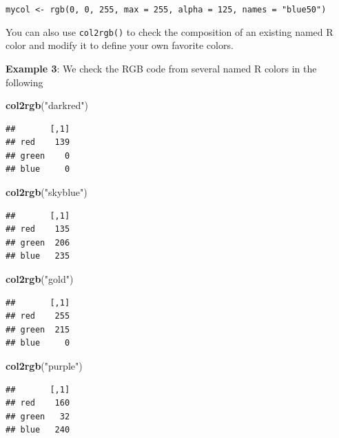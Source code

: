 \documentclass[
]{book}
\newenvironment{Shaded}{\begin{snugshade}}{\end{snugshade}}
\newcommand{\FunctionTok}[1]{\textcolor[rgb]{0.13,0.29,0.53}{\textbf{#1}}}
\newcommand{\NormalTok}[1]{#1}
\newcommand{\StringTok}[1]{\textcolor[rgb]{0.31,0.60,0.02}{#1}}
\begin{document}
\texttt{mycol\ \textless{}-\ rgb(0,\ 0,\ 255,\ max\ =\ 255,\ alpha\ =\ 125,\ names\ =\ "blue50")}

You can also use \texttt{col2rgb()} to check the composition of an existing named R color and modify it to define your own favorite colors.

\textbf{Example 3}: We check the RGB code from several named R colors in the following

\begin{Shaded}
\begin{Highlighting}[]
\FunctionTok{col2rgb}\NormalTok{(}\StringTok{"darkred"}\NormalTok{)}
\end{Highlighting}
\end{Shaded}

\begin{verbatim}
##       [,1]
## red    139
## green    0
## blue     0
\end{verbatim}

\begin{Shaded}
\begin{Highlighting}[]
\FunctionTok{col2rgb}\NormalTok{(}\StringTok{"skyblue"}\NormalTok{)}
\end{Highlighting}
\end{Shaded}

\begin{verbatim}
##       [,1]
## red    135
## green  206
## blue   235
\end{verbatim}

\begin{Shaded}
\begin{Highlighting}[]
\FunctionTok{col2rgb}\NormalTok{(}\StringTok{"gold"}\NormalTok{)}
\end{Highlighting}
\end{Shaded}

\begin{verbatim}
##       [,1]
## red    255
## green  215
## blue     0
\end{verbatim}

\begin{Shaded}
\begin{Highlighting}[]
\FunctionTok{col2rgb}\NormalTok{(}\StringTok{"purple"}\NormalTok{)}
\end{Highlighting}
\end{Shaded}

\begin{verbatim}
##       [,1]
## red    160
## green   32
## blue   240
\end{verbatim}
\end{document}
